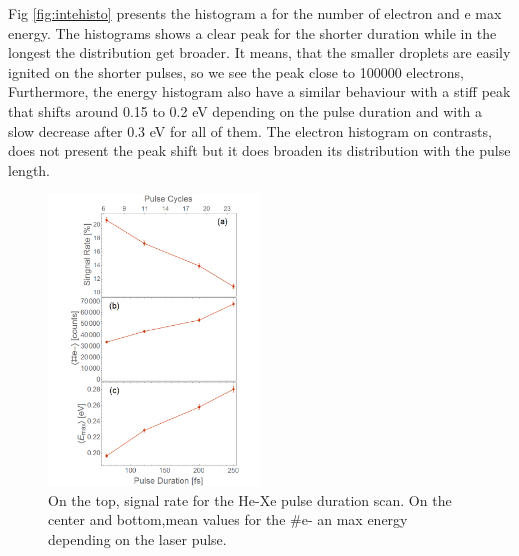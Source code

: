 Fig \ref{fig:intehisto} presents the histogram a for the number of electron and e max energy. The histograms shows a clear peak for the shorter duration while in the longest the distribution get broader. It means, that the smaller droplets are easily ignited on the shorter pulses, so we see the peak close to 100000 electrons, Furthermore, the energy histogram also  have a similar behaviour with a stiff peak that shifts around 0.15 to 0.2 eV depending on the pulse duration and with a slow decrease after 0.3 eV for all of them. The electron histogram on contrasts, does not present the peak shift but it does broaden its distribution with the pulse length.



\begin{figure}[hbtp]
\centering
\includegraphics[width=0.5\textwidth]{../Images/results/MIR_He_pulsescan/raw/Alltogether.png}
\caption[MIR He pulse scan. Signal rate and mean values]{On the top, signal rate for the He-Xe  pulse duration scan. On the center and bottom,mean values for the $\#$e- an max energy depending on the laser pulse.}
\label{fig:Hepulseall}
\end{figure}

